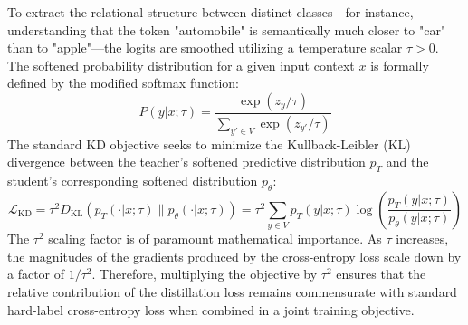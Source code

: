 \documentclass{article} %
\newcommand{\KL}{D_{\mathrm{KL}}}
\newcommand{\ptheta}{p_\theta}
\newcommand{\pteacher}{p_T}
\newcommand{\loss}{\mathcal{L}}
\begin{document}
To extract the relational structure between distinct classes—for instance, understanding that the token "automobile" is semantically much closer to "car" than to "apple"—the logits are smoothed utilizing a temperature scalar $\tau > 0$. The softened probability distribution for a given input context $x$ is formally defined by the modified softmax function:
\begin{equation}
    P(y|x; \tau) = \frac{\exp(z_y / \tau)}{\sum_{y' \in V} \exp(z_{y'} / \tau)}
\end{equation}
The standard KD objective seeks to minimize the Kullback-Leibler (KL) divergence between the teacher's softened predictive distribution $\pteacher$ and the student's corresponding softened distribution $\ptheta$:
\begin{equation}
    \loss_{\mathrm{KD}} = \tau^2 \KL(\pteacher(\cdot|x; \tau) \parallel \ptheta(\cdot|x; \tau)) = \tau^2 \sum_{y \in V} \pteacher(y|x; \tau) \log \left( \frac{\pteacher(y|x; \tau)}{\ptheta(y|x; \tau)} \right)
\end{equation}
The $\tau^2$ scaling factor is of paramount mathematical importance. As $\tau$ increases, the magnitudes of the gradients produced by the cross-entropy loss scale down by a factor of $1/\tau^2$. Therefore, multiplying the objective by $\tau^2$ ensures that the relative contribution of the distillation loss remains commensurate with standard hard-label cross-entropy loss when combined in a joint training objective. 
\end{document}
